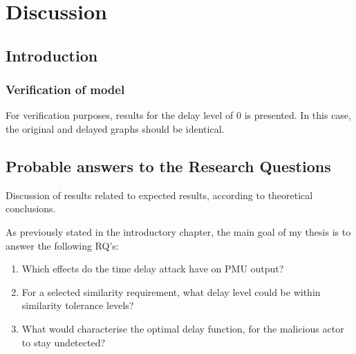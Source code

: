 \chapter{Discussion} \label{chap:Discussions}



\section{Introduction}


\subsection{Verification of model}

For verification purposes, results for the delay level of 0 is presented.  In this case, the original and delayed graphs should be identical.




\section{Probable answers to the Research Questions}

Discussion of results related to expected results, according to theoretical conclusions.




As previously stated in the introductory chapter, the main goal of my thesis is to answer the following RQ's: 

\begin{enumerate}
    \item Which effects do the time delay attack have on PMU output?
    \item For a selected similarity requirement, what delay level could be within similarity tolerance levels?
    \item What would characterise the optimal delay function, for the malicious actor to stay undetected?    
\end{enumerate}

